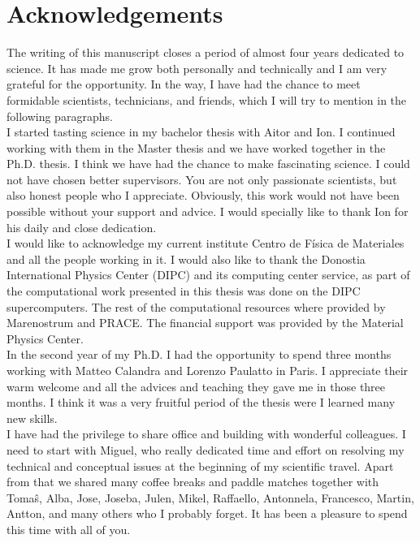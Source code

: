 
\chapter*{Acknowledgements} %

The writing of this manuscript closes a period of almost four years dedicated to science. It has made me grow both 
personally and technically and I am very grateful for the opportunity. In the way, I have had the chance to meet 
formidable scientists, technicians, and friends, which I will try to mention in the following paragraphs. \\

I started tasting science in my bachelor thesis with Aitor and Ion. I continued working with them in the Master 
thesis and we have worked together in the Ph.D. thesis. I think we have had the chance to make fascinating science. I 
could not have chosen better supervisors. You are not only passionate scientists, but also honest people who I 
appreciate. Obviously, this work would not have been possible without your support and advice. I would specially like 
to thank Ion for his daily and close dedication. \\

I would like to acknowledge my current institute Centro de F\'isica de Materiales and all the people working in it. I 
would also like to thank the Donostia International Physics Center (DIPC) and its computing center service, as part 
of the computational work presented in this thesis was done on the DIPC supercomputers. The rest of the computational
resources where provided by Marenostrum and PRACE. The financial support was provided by the Material Physics 
Center. \\

In the second year of my Ph.D. I had the opportunity to spend three months working with Matteo Calandra and Lorenzo 
Paulatto in Paris. I appreciate their warm welcome and all the advices and teaching they gave me in those three 
months. I think it was a very fruitful period of the thesis were I learned many new skills. \\

I have had the privilege to share office and building with wonderful colleagues. I need to start with Miguel, who 
really dedicated time and effort on resolving my technical and conceptual issues at the beginning of my scientific 
travel. Apart from that we shared many coffee breaks and paddle matches together with Toma\^s, Alba, Jose, Joseba, 
Julen, Mikel, Raffaello, Antonnela, Francesco, Martin, Antton, and many others who I probably forget. It has been a 
pleasure to spend this time with all of you. \\

